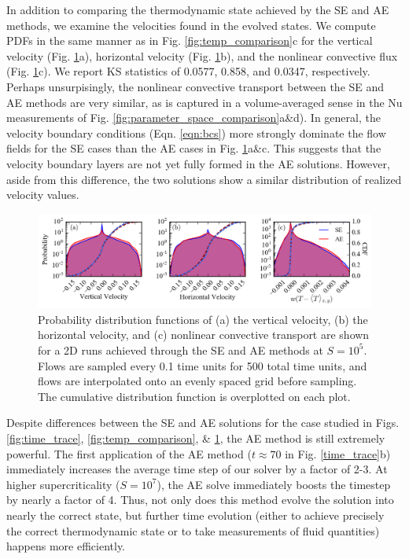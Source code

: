 \documentclass[aps, pre, onecolumn, nofootinbib, notitlepage, groupedaddress, amsfonts, amssymb, amsmath, longbibliography]{revtex4-1}
\begin{document}
In addition to comparing the thermodynamic state achieved by the SE and AE methods,
we examine the velocities found in the evolved states.
We compute PDFs in the same manner as in Fig. \ref{fig:temp_comparison}c for the
vertical velocity (Fig. \ref{fig:pdf_comparison}a), horizontal velocity (Fig. \ref{fig:pdf_comparison}b),
and the nonlinear convective flux (Fig. \ref{fig:pdf_comparison}c). We report KS statistics
of 0.0577, 0.858, and 0.0347, respectively.  Perhaps unsurpisingly, the nonlinear
convective transport between the SE and AE methods are very similar, as is captured
in a volume-averaged sense in the Nu measurements of Fig. \ref{fig:parameter_space_comparison}a\&d).
In general, the velocity boundary conditions (Eqn. \ref{eqn:bcs}) more strongly dominate the flow
fields for the SE cases than the AE cases in Fig. \ref{fig:pdf_comparison}a\&c. 
This suggests that the velocity boundary layers are not yet fully formed in the
AE solutions. However, aside from this difference, the two solutions show a similar
distribution of realized velocity values.

\begin{figure}[b]
\includegraphics[width=\textwidth]{./figs/pdf_comparison.png}
\caption{Probability distribution functions of (a) the vertical velocity, (b) the horizontal velocity, and (c) nonlinear
convective transport are shown for a 2D runs achieved through the SE and AE methods
at $S = 10^{5}$.  Flows are sampled every 0.1 time units for 500 total time units,
and flows are interpolated onto an evenly spaced grid before sampling.
The cumulative distribution function is overplotted on each plot. 
\label{fig:pdf_comparison} }
\end{figure}


Despite differences between the SE and AE solutions for the case studied in 
Figs. \ref{fig:time_trace}, \ref{fig:temp_comparison}, \& \ref{fig:pdf_comparison},
the AE method is still extremely powerful.  The first application of the AE method
($t \approx 70$ in Fig. \ref{time_trace}b) immediately increases the 
average time step of our solver by a factor of 2-3. At higher supercriticality
($S = 10^7$), the AE solve immediately boosts the timestep by nearly a factor of 4.
Thus, not only does this method evolve the solution into nearly the correct state, 
but further time evolution (either to achieve precisely the correct thermodynamic
state or to take measurements of fluid quantities) happens more efficiently.
\end{document}
